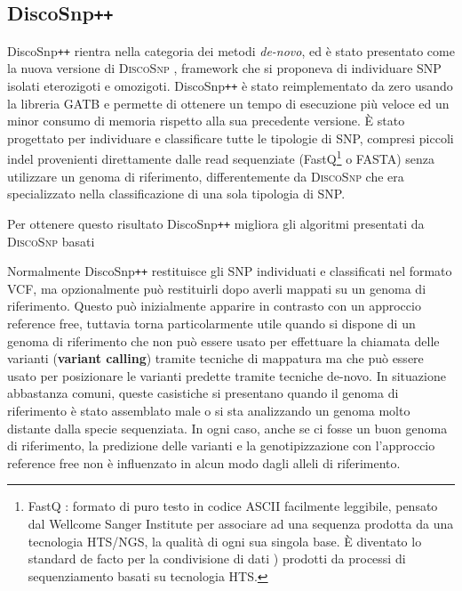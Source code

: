 \documentclass[../main.tex]{subfiles}
\begin{document}
\subsection{DiscoSnp\texttt{++}}
\label{discosnp++}

DiscoSnp\texttt{++} \cite{peterlongo2017discosnp++} rientra nella categoria dei metodi \textit{de-novo}, ed è stato presentato come la nuova versione di \textsc{DiscoSnp} \cite{uricaru2015reference}, framework che si proponeva di individuare SNP isolati eterozigoti e omozigoti. DiscoSnp\texttt{++} è stato reimplementato da zero usando la libreria GATB \cite{drezen2014gatb} e permette di ottenere un tempo di esecuzione più veloce ed un minor consumo di memoria rispetto alla sua precedente versione. È stato progettato per individuare e classificare tutte le tipologie di SNP, compresi piccoli indel provenienti direttamente dalle read sequenziate (FastQ\footnote{FastQ :  formato di puro testo in codice ASCII facilmente leggibile, pensato dal Wellcome Sanger Institute per associare ad una sequenza prodotta da una tecnologia HTS/NGS, la qualità di ogni sua singola base. È diventato lo standard de facto per la condivisione di dati \cite{cock2010sanger}) prodotti da processi di sequenziamento basati su tecnologia HTS. } o FASTA) senza utilizzare un genoma di riferimento, differentemente da \textsc{DiscoSnp} che era specializzato nella classificazione di una sola tipologia di SNP.

Per ottenere questo risultato DiscoSnp\texttt{++} migliora gli algoritmi presentati da \textsc{DiscoSnp} basati

\noindent
Normalmente DiscoSnp\texttt{++} restituisce gli SNP individuati e classificati nel formato VCF, ma opzionalmente può restituirli dopo averli mappati su un genoma di riferimento. Questo può inizialmente apparire in contrasto con un approccio reference free, tuttavia torna particolarmente utile quando si dispone di un genoma di riferimento che non può essere usato per effettuare la chiamata delle varianti (\textbf{variant calling}) tramite tecniche di mappatura ma che può essere usato per posizionare le varianti predette tramite tecniche de-novo. In situazione abbastanza comuni, queste casistiche si presentano quando il genoma di riferimento è stato assemblato male o si sta analizzando un genoma molto distante dalla specie sequenziata. In ogni caso, anche se ci fosse un buon genoma di riferimento, la predizione delle varianti e la genotipizzazione con l'approccio reference free non è influenzato in alcun modo dagli alleli di riferimento.
\end{document}
